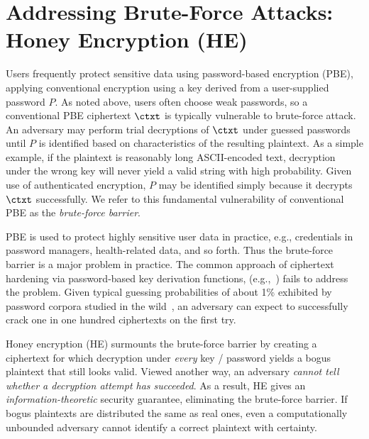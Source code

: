 \section{Addressing Brute-Force Attacks: Honey Encryption (HE)}
\label{sec:he}

Users frequently protect sensitive data using password-based encryption (PBE),
applying conventional encryption using a key derived from a user-supplied
password $P$. As noted above, users often choose weak passwords, so a
conventional PBE ciphertext $\ctxt$ is typically vulnerable to brute-force
attack. An adversary may perform trial decryptions of $\ctxt$ under guessed
passwords until $P$ is identified based on characteristics of the resulting
plaintext. As a simple example, if the plaintext is reasonably long ASCII-encoded text, 
decryption under the wrong key will never yield a valid string with high
probability.
Given use of authenticated encryption, $P$ may be identified simply because it
decrypts $\ctxt$ successfully. We refer to this fundamental vulnerability of
conventional PBE as the {\em brute-force barrier}.

PBE is used to protect highly sensitive user data in practice, e.g.,
credentials in password managers, health-related data, and so forth. Thus the
brute-force barrier is a major problem in practice. The common approach of
ciphertext hardening via password-based key derivation functions,
(e.g.,~\cite{PKCS520}) fails to address the problem. Given typical guessing
probabilities of about 1\% exhibited by password corpora studied in the
wild~\cite{Bonneau12,Bonneau12b}, an adversary can expect to successfully crack
one in one hundred ciphertexts on the first try.

Honey encryption (HE) surmounts the brute-force barrier by creating a ciphertext
for which decryption under {\em every} key / password yields a bogus
plaintext that still looks valid. Viewed another way, an adversary {\em cannot tell
whether a decryption attempt has succeeded}. As a result, HE gives an {\em
information-theoretic} security guarantee, eliminating the brute-force barrier.
If bogus plaintexts are distributed the same as real ones, even a computationally
unbounded adversary cannot identify a correct plaintext with certainty.


